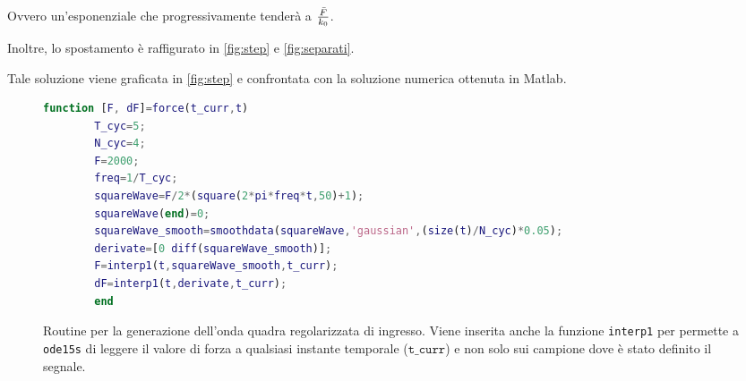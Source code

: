 Ovvero un'esponenziale che progressivamente tenderà a $\bar F\over k_0$. 

Inoltre, lo spostamento è raffigurato in \cref{fig:step} e \cref{fig:separati}.


Tale soluzione viene graficata in \cref{fig:step} e confrontata con la soluzione numerica ottenuta in Matlab.






\begin{figure}[t!]
	\begin{lstlisting}[language=matlab]
		function [F, dF]=force(t_curr,t)	
		T_cyc=5;
		N_cyc=4;
		F=2000;
		freq=1/T_cyc;
		squareWave=F/2*(square(2*pi*freq*t,50)+1);
		squareWave(end)=0;
		squareWave_smooth=smoothdata(squareWave,'gaussian',(size(t)/N_cyc)*0.05);
		derivate=[0 diff(squareWave_smooth)];
		F=interp1(t,squareWave_smooth,t_curr);
		dF=interp1(t,derivate,t_curr);
		end
	\end{lstlisting}
	\caption{Routine per la generazione dell'onda quadra regolarizzata di ingresso. Viene inserita anche la funzione \texttt{interp1} per permette a \texttt{ode15s} di leggere il valore di forza a qualsiasi instante temporale ($\mathtt{t\_curr}$) e non solo sui campione dove è stato definito il segnale.}
	\label{fig:force}
\end{figure}







